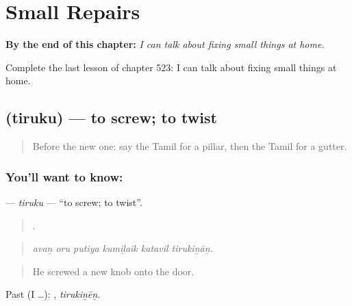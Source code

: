 
\chapter{Small Repairs}
\label{ch:ta-small-repairs}

\begin{chapteropening}
\textbf{By the end of this chapter:} \emph{I can talk about fixing small things at home.}

Complete the last lesson of chapter 523: I can talk about fixing small things at home.
\end{chapteropening}

\section[\texorpdfstring{\ta{திருகு} (tiruku)}{திருகு (tiruku)}]{ (tiruku) — to screw; to twist}

\label{lesson:TA-C523-tiruku}



\begin{quote}
Before the new one: say the Tamil for a pillar, then the Tamil for a gutter.
\end{quote}

\subsection*{You'll want to know: }
\textbf{} — \emph{tiruku} — \textquotedblleft{}to screw; to twist\textquotedblright{}.

\begin{quote}
     .
\end{quote}

\begin{quote}
\emph{avaṉ oru putiya kumiḻaik katavil tirukiṉāṉ.}
\end{quote}

\begin{quote}
He screwed a new knob onto the door.
\end{quote}

Past (I …): , \emph{tirukiṉēṉ}.

